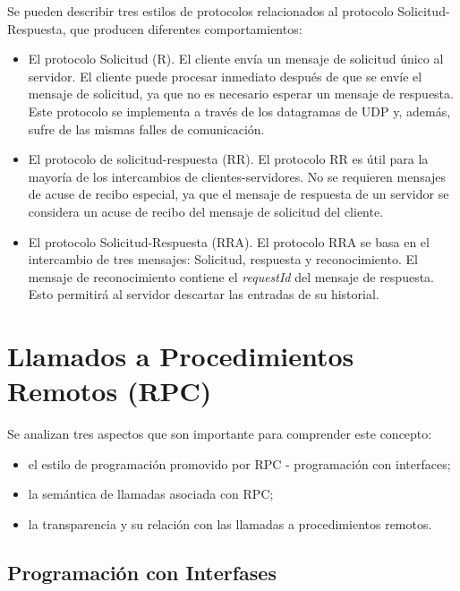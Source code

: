 Se pueden describir tres estilos de protocolos relacionados al protocolo Solicitud-Respuesta, que producen diferentes comportamientos:
\begin{itemize}
\item El protocolo Solicitud (R). El cliente envía un mensaje de solicitud único al servidor.  El cliente puede procesar inmediato después de que se envíe el mensaje de solicitud, ya que no es necesario esperar un mensaje de respuesta. Este protocolo se implementa a través de los datagramas de UDP y, además, sufre de las mismas falles de comunicación.



\item  El protocolo de solicitud-respuesta (RR). El protocolo RR es útil para la mayoría de los intercambios de clientes-servidores. No se requieren mensajes de acuse de recibo especial, ya que el mensaje de respuesta de un servidor se considera un acuse de recibo del mensaje de solicitud del cliente. 


\item   El protocolo  Solicitud-Respuesta (RRA).  El protocolo RRA se basa en el intercambio de tres mensajes: Solicitud, respuesta y reconocimiento. El mensaje de reconocimiento    contiene el \textit{requestId} del mensaje de  respuesta. Esto permitirá al servidor descartar las entradas de su historial. 
\end{itemize}


 

\section{Llamados a Procedimientos Remotos (RPC)}
\label{sec:RPC}

Se analizan tres aspectos que son importante para comprender este concepto:
\begin{itemize}
	\item el estilo de programación promovido por RPC - programación con interfaces;
	\item la semántica de llamadas asociada con RPC;
	\item  la transparencia y su relación con las llamadas a procedimientos remotos.
\end{itemize}

\subsection{Programaci\'on con Interfases}

